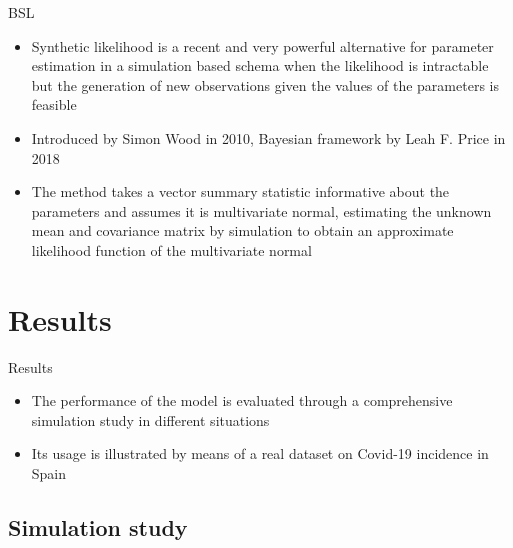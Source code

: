 \documentclass[
    10pt,
    aspectratio=169,
    usenames,
    dvipsnames
]{beamer}
\begin{document}
\begin{frame}{BSL}
\begin{itemize}
 \item Synthetic likelihood is a recent and very powerful alternative for parameter estimation in a simulation based schema when the likelihood is intractable but the generation of new observations given the values of the parameters is feasible
 \item Introduced by Simon Wood in 2010, Bayesian framework by Leah F. Price in 2018
 \item The method takes a vector summary statistic informative about the parameters and assumes it is multivariate normal, estimating the unknown mean and covariance matrix by simulation to obtain an approximate likelihood function of the multivariate normal
\end{itemize}
\end{frame}

\section{Results}
\begin{frame}{Results}
\begin{itemize}
 \item The performance of the model is evaluated through a comprehensive simulation study in different situations
 \item Its usage is illustrated by means of a real dataset on Covid-19 incidence in Spain
\end{itemize}
\end{frame}

\subsection{Simulation study}
\end{document}
